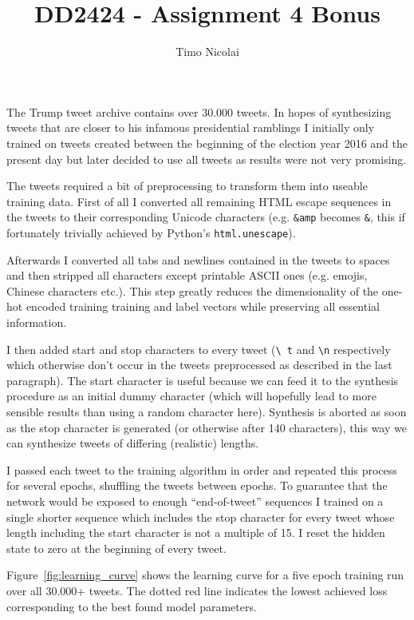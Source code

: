 \documentclass{article}
\begin{document}
\title{DD2424 - Assignment 4 Bonus}
\author{Timo Nicolai}

\maketitle

\noindent
The Trump tweet archive contains over 30.000 tweets. In hopes of synthesizing
tweets that are closer to his infamous presidential ramblings I initially only
trained on tweets created between the beginning of the election year 2016 and
the present day but later decided to use all tweets as results were not very
promising.

The tweets required a bit of preprocessing to transform them into useable
training data. First of all I converted all remaining HTML escape sequences in
the tweets to their corresponding Unicode characters (e.g. \texttt{\&amp}
becomes \texttt{\&}, this if fortunately trivially achieved by Python's
\texttt{html.unescape}).

Afterwards I converted all tabs and newlines contained in the tweets to spaces
and then stripped all characters except printable ASCII ones (e.g.  emojis,
Chinese characters etc.). This step greatly reduces the dimensionality of the
one-hot encoded training training and label vectors while preserving all
essential information.

I then added start and stop characters to every tweet (\texttt{\textbackslash
t} and \texttt{\textbackslash n} respectively which otherwise don't occur in
the tweets preprocessed as described in the last paragraph). The start
character is useful because we can feed it to the synthesis procedure as an
initial dummy character (which will hopefully lead to more sensible results
than using a random character here).  Synthesis is aborted as soon as the stop
character is generated (or otherwise after 140 characters), this way we can
synthesize tweets of differing (realistic) lengths.

I passed each tweet to the training algorithm in order and repeated this
process for several epochs, shuffling the tweets between epochs. To
guarantee that the network would be exposed to enough ``end-of-tweet''
sequences I trained on a single shorter sequence which includes the stop
character for every tweet whose length including the start character is not a
multiple of 15. I reset the hidden state to zero at the beginning of every
tweet.

Figure~\ref{fig:learning_curve} shows the learning curve for a five epoch
training run over all 30.000+ tweets. The dotted red line indicates the lowest
achieved loss corresponding to the best found model parameters.
\end{document}
